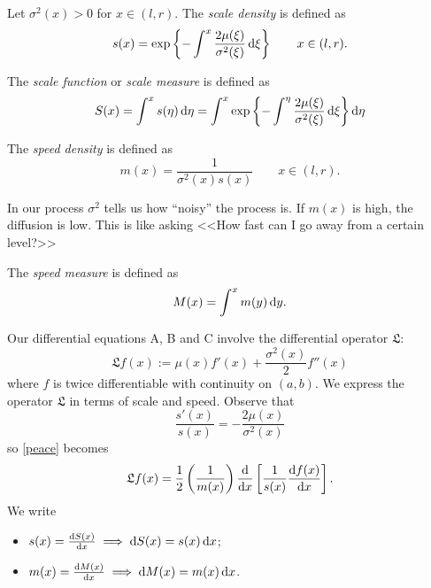 \documentclass[12pt]{report}
\begin{document}
\begin{definition}
	Let $\sigma^{2}(x)>0$ for $x\in(l,r)$. The \emph{scale density} is defined as
	\begin{equation*}
		s(x)=\exp\left\{-\int^{x}\frac{2\mu(\xi)}{\sigma^{2}(\xi)}\mathop{}\!\mathrm{d}\xi\right\}\qquad x\in(l,r).
	\end{equation*}
\end{definition}
\begin{definition}
	The \emph{scale function} or \emph{scale measure} is defined as
	\begin{equation*}
		S(x)=\int^{x}s(\eta)\mathop{}\!\mathrm{d}\eta=\int^{x}\exp\left\{-\int^{\eta}\frac{2\mu(\xi)}{\sigma^{2}(\xi)}\mathop{}\!\mathrm{d}\xi\right\}\mathop{}\!\mathrm{d}\eta
	\end{equation*}
\end{definition}
\begin{definition}
	The \emph{speed density} is defined as
	\begin{equation*}
		m(x)=\frac{1}{\sigma^{2}(x)s(x)}\qquad x\in(l,r).
	\end{equation*}
\end{definition}
In our process $\sigma^{2}$ tells us how ``noisy'' the process is. If $m(x)$ is high, the diffusion is low. This is like asking <<How fast can I go away from a certain level?>>
\begin{definition}
	The \emph{speed measure} is defined as
	\begin{equation*}
		M(x)=\int^{x}m(y)\mathop{}\!\mathrm{d} y.
	\end{equation*}
\end{definition}
Our differential equations A, B and C involve the differential operator $\mathfrak{L}$:
\begin{equation*}
	\mathfrak{L}f(x):=\mu(x)f'(x)+\frac{\sigma^{2}(x)}{2}f''(x)\tag*{\faHandPeace}\label{peace}
\end{equation*}
where $f$ is twice differentiable with continuity on $(a,b)$. We express the operator $\mathfrak{L}$ in terms of scale and speed. Observe that
\begin{equation*}
	\frac{s'(x)}{s(x)}=-\frac{2\mu(x)}{\sigma^{2}(x)}
\end{equation*}
so \ref{peace} becomes
\begin{equation*}
	\mathfrak{L}f(x)=\frac{1}{2}\left(\frac{1}{m(x)}\right)\frac{\mathop{}\!\mathrm{d}}{\mathop{}\!\mathrm{d} x}\left[\frac{1}{s(x)}\frac{\mathop{}\!\mathrm{d} f(x)}{\mathop{}\!\mathrm{d} x}\right].
\end{equation*}
We write
\begin{itemize}
	\item $s(x)=\frac{\mathop{}\!\mathrm{d} S(x)}{\mathop{}\!\mathrm{d} x}\implies\mathop{}\!\mathrm{d} S(x)=s(x)\mathop{}\!\mathrm{d} x$;
	\item $m(x)=\frac{\mathop{}\!\mathrm{d} M(x)}{\mathop{}\!\mathrm{d} x}\implies\mathop{}\!\mathrm{d} M(x)=m(x)\mathop{}\!\mathrm{d} x$.
\end{itemize}
\end{document}
